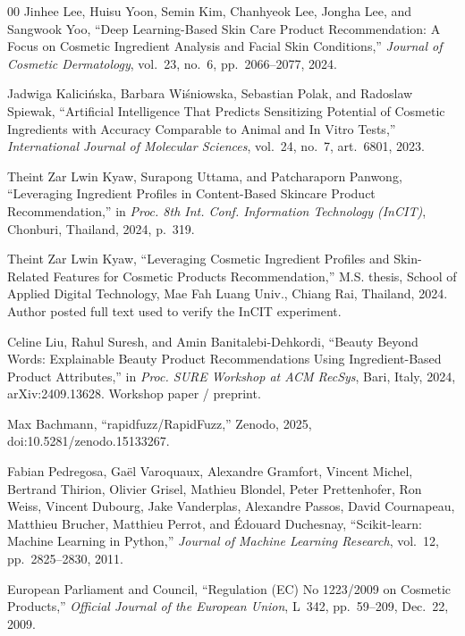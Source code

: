\documentclass[conference]{IEEEtran}
\begin{document}
\begin{thebibliography}{00}
Jinhee Lee, Huisu Yoon, Semin Kim, Chanhyeok Lee, Jongha Lee, and Sangwook Yoo, ``Deep Learning-Based Skin Care Product Recommendation: A Focus on Cosmetic Ingredient Analysis and Facial Skin Conditions,'' \emph{Journal of Cosmetic Dermatology}, vol.~23, no.~6, pp.~2066--2077, 2024.

Jadwiga Kalici\'{n}ska, Barbara Wi\'{s}niowska, Sebastian Polak, and Radoslaw Spiewak, ``Artificial Intelligence That Predicts Sensitizing Potential of Cosmetic Ingredients with Accuracy Comparable to Animal and In Vitro Tests,'' \emph{International Journal of Molecular Sciences}, vol.~24, no.~7, art.~6801, 2023.

Theint Zar Lwin Kyaw, Surapong Uttama, and Patcharaporn Panwong, ``Leveraging Ingredient Profiles in Content-Based Skincare Product Recommendation,'' in \emph{Proc. 8th Int. Conf. Information Technology (InCIT)}, Chonburi, Thailand, 2024, p.~319.

Theint Zar Lwin Kyaw, ``Leveraging Cosmetic Ingredient Profiles and Skin-Related Features for Cosmetic Products Recommendation,'' M.S. thesis, School of Applied Digital Technology, Mae Fah Luang Univ., Chiang Rai, Thailand, 2024. Author posted full text used to verify the InCIT experiment.

Celine Liu, Rahul Suresh, and Amin Banitalebi-Dehkordi, ``Beauty Beyond Words: Explainable Beauty Product Recommendations Using Ingredient-Based Product Attributes,'' in \emph{Proc. SURE Workshop at ACM RecSys}, Bari, Italy, 2024, arXiv:2409.13628. Workshop paper / preprint.

Max Bachmann, ``rapidfuzz/RapidFuzz,'' Zenodo, 2025, doi:10.5281/zenodo.15133267.

Fabian Pedregosa, Ga\"{e}l Varoquaux, Alexandre Gramfort, Vincent Michel, Bertrand Thirion, Olivier Grisel, Mathieu Blondel, Peter Prettenhofer, Ron Weiss, Vincent Dubourg, Jake Vanderplas, Alexandre Passos, David Cournapeau, Matthieu Brucher, Matthieu Perrot, and \'{E}douard Duchesnay, ``Scikit-learn: Machine Learning in Python,'' \emph{Journal of Machine Learning Research}, vol.~12, pp.~2825--2830, 2011.

European Parliament and Council, ``Regulation (EC) No 1223/2009 on Cosmetic Products,'' \emph{Official Journal of the European Union}, L~342, pp.~59--209, Dec.~22, 2009.
\end{thebibliography}
\end{document}
